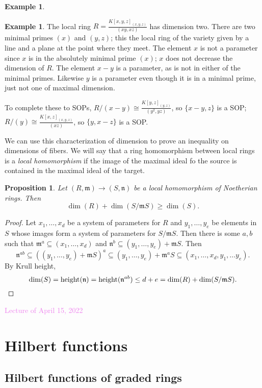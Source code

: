 \documentclass{amsart}[12pt]
\def\htt{\mathrm{height}}
\newcommand{\Apr}[1]{\textcolor{violet}{Lecture of April #1, 2022}}
\newcommand{\m}{{\mathfrak m}}
\newcommand{\DEF}[1]{\emph{#1}\index{#1}}
\numberwithin{equation}{section}
\theoremstyle{plain} %
\newtheorem{proposition}[equation]{Proposition}
\theoremstyle{definition}
\newtheorem{ex}[equation]{Example}
\theoremstyle{remark}
\begin{document}
\begin{ex}
\begin{ex} The local ring $\displaystyle R=\frac{K[x,y,z]_{(x,y,z)}}{(xy,xz)}$ has dimension two. There are two minimal primes $(x)$ and $(y,z)$; this the local ring of the variety given by a line and a plane at the point where they meet. The element $x$ is not a parameter since $x$ is in the absolutely minimal prime $(x)$; $x$ does not decrease the dimension of $R$. The element $x-y$ is a parameter, as is not in either of the minimal primes. Likewise $y$ is a parameter even though it is in a minimal prime, just not one of maximal dimension.

To complete these to SOPs, $R/(x-y) \cong \displaystyle \frac{K[y,z]_{(y,z)}}{(y^2,yz)}$, so $\{x-y,z\}$ is a SOP; $R/(y)\cong \displaystyle \frac{K[x,z]_{(x,y,z)}}{(xz)}$, so $\{y,x-z\}$ is a SOP.
\end{ex}

We can use this characterization of dimension to prove an inequality on dimensions of fibers. We will say that a ring homomorphism between local rings is a \DEF{local homomorphism} if the image of the maximal ideal fo the source is contained in the maximal ideal of the target.

\begin{proposition} Let $(R,\m) \to (S,\mathfrak{n})$ be a local homomorphism of Noetherian rings. Then
\[ \dim(R) + \dim(S/\m S) \geq \dim(S).\]
\end{proposition}
\begin{proof}  Let $x_1,\dots,x_d$ be a system of parameters for $R$ and $y_1,\dots,y_e$ be elements in $S$ whose images form a system of parameters for $S/\m S$. Then there is some $a,b$ such that $\m^a \subseteq (x_1,\dots,x_d)$ and $\mathfrak{n}^b \subseteq (y_1,\dots,y_e) + \m S$. Then \[ \mathfrak{n}^{ab} \subseteq ( (y_1,\dots,y_e) + \m S)^a \subseteq  (y_1,\dots,y_e) + \m^a S \subseteq (x_1,\dots,x_d,y_1,\dots y_e).\]
By Krull height,
\[ \dim(S) = \htt(\mathfrak{n}) = \htt(\mathfrak{n}^{ab}) \leq d+e = \dim(R) + \dim(S/\m S).\qedhere\]
\end{proof}

\Apr{15}

\section{Hilbert functions}



\subsection{Hilbert functions of graded rings}



\end{ex}
\end{document}
